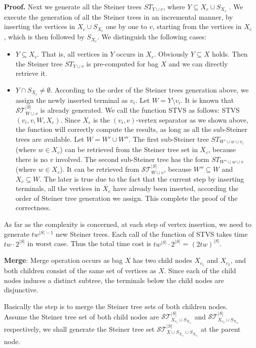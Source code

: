 \documentclass[preprint,12pt]{elsarticle}
\newenvironment{proof}{\begin{trivlist}\item[]\textbf{Proof.}}{\end{trivlist}}
\newcommand{\stset}{\mathcal{ST}}
\begin{document}
\begin{proof}
Next we generate all the Steiner trees $ST_{Y \cup v}$, where
$Y \subseteq X_c \cup S_{X_c}$ . 
We execute the generation of all the Steiner trees in an incremental manner, 
by inserting the vertices in $X_c \cup S_{X_c}$ one by one to $v$, starting from
the vertices in $X_c$, which is then followed by $S_{X_c}$.
We distinguish the following cases:
\begin{itemize}
\item
$Y \subseteq X_c$. That is, all vertices in $Y$ occurs in $X_c$. Obviously 
$ Y \subseteq X$ holds. Then the Steiner tree $ST_{Y \cup v}$ is pre-computed
for bag $X$ and we can directly retrieve it.
\item 
$Y \cap S_{X_c} \neq \emptyset$. According to the order of the Steiner trees generation above, we assign the newly inserted terminal as $v_i$. 
Let $W = Y \setminus v_i$.
It is known that $\stset_{W \cup v}^{|S|}$ is already generated.
We call the function STVS as follows: 
STVS$(v_i, v, W, X_c)$. Since $X_c$ is the $(v_i,v)$-vertex separator as we shown above,
the function will correctly compute the results, as long as all the sub-Steiner trees are available.
Let $W=W' \cup W''$. The first sub-Steiner tree $ST_{W' \cup w \cup v_i}$ (where $w \in X_c$)
can be retrieved from the Steiner tree set in $X_c$, because there is no $v$ involved.
The second sub-Steiner tree has the form $ST_{W'' \cup w \cup v}$ (where $w \in X_c$).
It can be retrieved from $\stset_{W \cup v}^{|S|}$, because $W'' \subseteq W$ and 
$X_c \subseteq W$. The later is true due to the fact that the current step by inserting terminals,
all the vertices in $X_c$ have already been inserted, according the order of Steiner tree generation we assign.
This complete the proof of the correctness.
\end{itemize}

As far as the complexity is concerned, at each step of vertex insertion, 
we need to generate $tw^{|S|-1}$ new Steiner trees. Each call of the function of STVS
takes time $tw \cdot 2^{|S|}$ in worst case. Thus the total time cost 
is $tw^{|S|} \cdot 2^{|S|}$ = $(2tw)^{|S|}$.

\noindent 
{\bf Merge}: Merge operation occurs as bag $X$ has two child nodes $X_{c_1}$ and $X_{c_2}$,
and both children consist of the same set of vertices as $X$.
Since each of the child nodes induces a distinct subtree, the terminals below the child nodes
are disjunctive. 


Basically the step is to merge the Steiner tree sets of both children nodes.
Assume the Steiner tree set of both child nodes are $\stset_{X_{c_1} \cup S_{X_{c_1}}}^{|S|}$
and $\stset_{X_{c_2} \cup S_{X_{c_2}}}^{|S|}$ respectively, we shall generate the Steiner tree
set $\stset_{X \cup S_{X_{c_1}} \cup S_{X_{c_2}}}^{|S|}$  at the parent node.


\end{proof}
\end{document}
